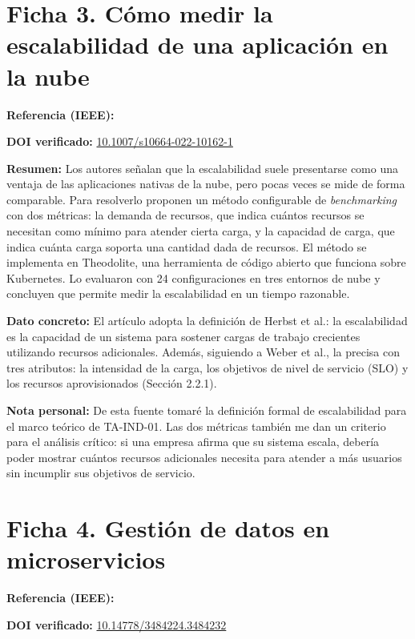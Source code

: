 \documentclass[11pt,a4paper]{article}
\newcommand{\campo}[1]{\par\textbf{#1}\enspace}
\begin{document}
\section*{Ficha 3. Cómo medir la escalabilidad de una aplicación en la nube}

\campo{Referencia (IEEE):} 

\campo{DOI verificado:} \href{https://doi.org/10.1007/s10664-022-10162-1}{10.1007/s10664-022-10162-1}

\campo{Resumen:} Los autores señalan que la escalabilidad suele presentarse como una ventaja de las aplicaciones nativas de la nube, pero pocas veces se mide de forma comparable. Para resolverlo proponen un método configurable de \emph{benchmarking} con dos métricas: la demanda de recursos, que indica cuántos recursos se necesitan como mínimo para atender cierta carga, y la capacidad de carga, que indica cuánta carga soporta una cantidad dada de recursos. El método se implementa en Theodolite, una herramienta de código abierto que funciona sobre Kubernetes. Lo evaluaron con 24 configuraciones en tres entornos de nube y concluyen que permite medir la escalabilidad en un tiempo razonable.

\campo{Dato concreto:} El artículo adopta la definición de Herbst et al.: la escalabilidad es la capacidad de un sistema para sostener cargas de trabajo crecientes utilizando recursos adicionales. Además, siguiendo a Weber et al., la precisa con tres atributos: la intensidad de la carga, los objetivos de nivel de servicio (SLO) y los recursos aprovisionados (Sección 2.2.1).

\campo{Nota personal:} De esta fuente tomaré la definición formal de escalabilidad para el marco teórico de TA-IND-01. Las dos métricas también me dan un criterio para el análisis crítico: si una empresa afirma que su sistema escala, debería poder mostrar cuántos recursos adicionales necesita para atender a más usuarios sin incumplir sus objetivos de servicio.

\section*{Ficha 4. Gestión de datos en microservicios}

\campo{Referencia (IEEE):} 

\campo{DOI verificado:} \href{https://doi.org/10.14778/3484224.3484232}{10.14778/3484224.3484232}
\end{document}
